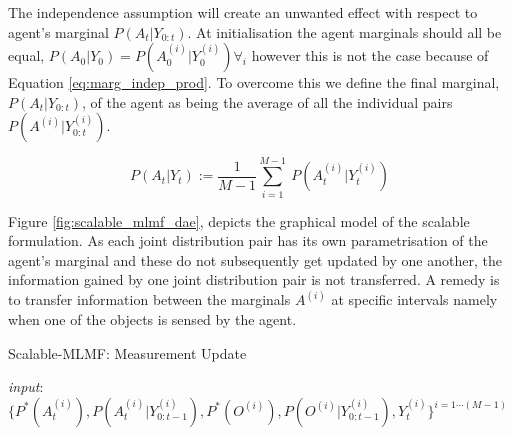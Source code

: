 The independence assumption will create an unwanted effect with respect to agent's marginal $P(A_t|Y_{0:t})$. 
At initialisation the agent marginals should all be equal, $P(A_0|Y_0) = P(A^{(i)}_0|Y^{(i)}_0) \forall_i$ however this is not the case because of 
Equation \ref{eq:marg_indep_prod}. To overcome this we define the final marginal, $P(A_t|Y_{0:t})$, of the agent as being the average of all the individual
pairs $P(A^{(i)}|Y^{(i)}_{0:t})$.

\begin{equation}
  P(A_t|Y_t) := \frac{1}{M-1} \sum\limits_{i=1}^{M-1} \ P(A^{(i)}_t|Y^{(i)}_t) \label{eq:marg_indep_sum}
\end{equation}

Figure \ref{fig:scalable_mlmf_dae}, depicts the graphical model of the scalable formulation. 
As each joint distribution pair has its own parametrisation of the agent's marginal and these do not subsequently get updated by one another,
the information gained by one joint distribution pair is not transferred.
A remedy is to transfer information between the marginals $A^{(i)}$ at specific intervals namely when one of the objects is sensed by the agent. 


\begin{algorithm}
\caption{Scalable-MLMF: Measurement Update}
\textit{input}: $\{P^{*}(A^{(i)}_t),P(A^{(i)}_t|Y^{(i)}_{0:t-1}),P^{*}(O^{(i)}),P(O^{(i)}|Y^{(i)}_{0:t-1}),Y^{(i)}_t\}^{i=1\cdots (M-1)}$
  \begin{algorithmic}[1]
   
          
	 
      \EndFor 
\vspace{-1em}	\Else
  \EndIf
\end{algorithmic} \label{alg:scalabe-mrf-slam}
\end{algorithm}


